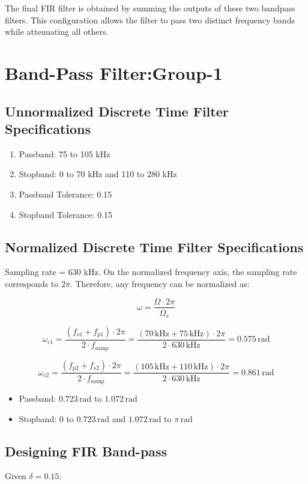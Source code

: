 \documentclass[12pt]{article}
\begin{document}
The final FIR filter is obtained by summing the outputs of these two bandpass filters. This configuration allows the filter to pass two distinct frequency bands while attenuating all others.


\section{Band-Pass Filter:Group-1}
\subsection{Unnormalized Discrete Time Filter Specifications}
\begin{enumerate}
    \item Passband: 75 to 105 kHz
    \item Stopband: 0 to 70 kHz and 110 to 280 kHz
    \item Passband Tolerance: 0.15
    \item Stopband Tolerance: 0.15
\end{enumerate}

\subsection{Normalized Discrete Time Filter Specifications}
Sampling rate = 630 kHz. On the normalized frequency axis, the sampling rate corresponds to \( 2\pi \). Therefore, any frequency can be normalized as:

\[
\omega = \frac{\Omega \cdot 2\pi}{\Omega_s}
\]

\[
\omega_{c1} = \frac{(f_{s1} + f_{p1}) \cdot 2\pi}{2 \cdot f_{\text{samp}}}
= \frac{(70\,\text{kHz} + 75\,\text{kHz}) \cdot 2\pi}{2 \cdot 630\,\text{kHz}}
= 0.575\,\text{rad}
\]

\[
\omega_{c2} = \frac{(f_{p2} + f_{s2}) \cdot 2\pi}{2 \cdot f_{\text{samp}}}
= \frac{(105\,\text{kHz} + 110\,\text{kHz}) \cdot 2\pi}{2 \cdot 630\,\text{kHz}}
= 0.861\,\text{rad}
\]


\begin{itemize}
    \item Passband: \(0.723\,\text{rad}\) to \(1.072\,\text{rad}\)
    \item Stopband: \(0\) to \(0.723\,\text{rad}\) and \(1.072\,\text{rad}\) to \(\pi\,\text{rad}\)
\end{itemize}


\subsection{Designing FIR Band-pass}
Given \( \delta = 0.15 \):
\end{document}
